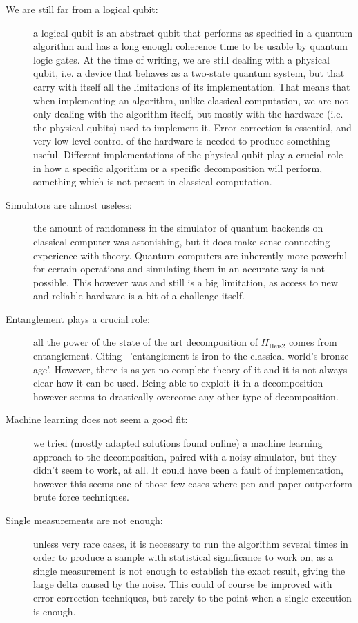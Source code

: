 \begin{description}
    \item[We are still far from a logical qubit: ]a logical qubit is an abstract qubit that performs as specified in a quantum algorithm and has a long enough coherence time to be usable by quantum logic gates. At the time of writing, we are still dealing with a physical qubit, i.e. a device that behaves as a two-state quantum system, but that carry with itself all the limitations of its implementation. That means that when implementing an algorithm, unlike classical computation, we are not only dealing with the algorithm itself, but mostly with the hardware (i.e. the physical qubits) used to implement it. Error-correction is essential, and very low level control of the hardware is needed to produce something useful. Different implementations of the physical qubit play a crucial role in how a specific algorithm or a specific decomposition will perform, something which is not present in classical computation.
    \item[Simulators are almost useless: ]the amount of randomness in the simulator of quantum backends on classical computer was astonishing, but it does make sense connecting experience with theory. Quantum computers are inherently more powerful for certain operations and simulating them in an accurate way is not possible. This however was and still is a big limitation, as access to new and reliable hardware is a bit of a challenge itself.
    \item[Entanglement plays a crucial role: ]all the power of the state of the art decomposition of $H_{\text{Heis2}}$ comes from entanglement. Citing~\cite{NielsenChuang} 'entanglement is iron to the classical world's bronze age'. However, there is as yet no complete theory of it and it is not always clear how it can be used. Being able to exploit it in a decomposition however seems to drastically overcome any other type of decomposition.
    \item[Machine learning does not seem a good fit: ]we tried (mostly adapted solutions found online) a machine learning approach to the decomposition, paired with a noisy simulator, but they didn't seem to work, at all. It could have been a fault of implementation, however this seems one of those few cases where pen and paper outperform brute force techniques.
    \item[Single measurements are not enough: ]unless very rare cases, it is necessary to run the algorithm several times in order to produce a sample with statistical significance to work on, as a single measurement is not enough to establish the exact result, giving the large delta caused by the noise. This could of course be improved with error-correction techniques, but rarely to the point when a single execution is enough.

\end{description}


